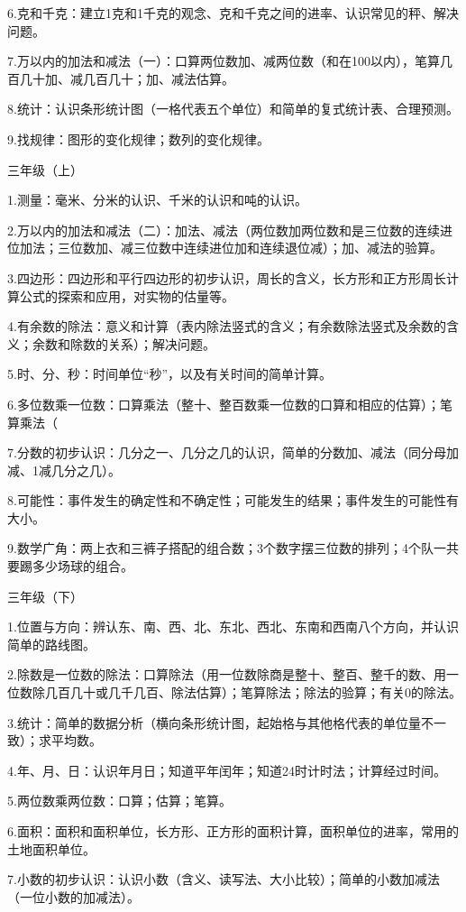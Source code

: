 6.克和千克：建立1克和1千克的观念、克和千克之间的进率、认识常见的秤、解决问题。

7.万以内的加法和减法（一）：口算两位数加、减两位数（和在100以内），笔算几百几十加、减几百几十；加、减法估算。

8.统计：认识条形统计图（一格代表五个单位）和简单的复式统计表、合理预测。

9.找规律：图形的变化规律；数列的变化规律。

三年级（上）

1.测量：毫米、分米的认识、千米的认识和吨的认识。

2.万以内的加法和减法（二）：加法、减法（两位数加两位数和是三位数的连续进位加法；三位数加、减三位数中连续进位加和连续退位减）；加、减法的验算。

3.四边形：四边形和平行四边形的初步认识，周长的含义，长方形和正方形周长计算公式的探索和应用，对实物的估量等。

4.有余数的除法：意义和计算（表内除法竖式的含义；有余数除法竖式及余数的含义；余数和除数的关系）；解决问题。

5.时、分、秒：时间单位“秒”，以及有关时间的简单计算。

6.多位数乘一位数：口算乘法（整十、整百数乘一位数的口算和相应的估算）；笔算乘法（

7.分数的初步认识：几分之一、几分之几的认识，简单的分数加、减法（同分母加减、1减几分之几）。

8.可能性：事件发生的确定性和不确定性；可能发生的结果；事件发生的可能性有大小。

9.数学广角：两上衣和三裤子搭配的组合数；3个数字摆三位数的排列；4个队一共要踢多少场球的组合。

三年级（下）

1.位置与方向：辨认东、南、西、北、东北、西北、东南和西南八个方向，并认识简单的路线图。

2.除数是一位数的除法：口算除法（用一位数除商是整十、整百、整千的数、用一位数除几百几十或几千几百、除法估算）；笔算除法；除法的验算；有关0的除法。

3.统计：简单的数据分析（横向条形统计图，起始格与其他格代表的单位量不一致）；求平均数。

4.年、月、日：认识年月日；知道平年闰年；知道24时计时法；计算经过时间。

5.两位数乘两位数：口算；估算；笔算。

6.面积：面积和面积单位，长方形、正方形的面积计算，面积单位的进率，常用的土地面积单位。

7.小数的初步认识：认识小数（含义、读写法、大小比较）；简单的小数加减法（一位小数的加减法）。

